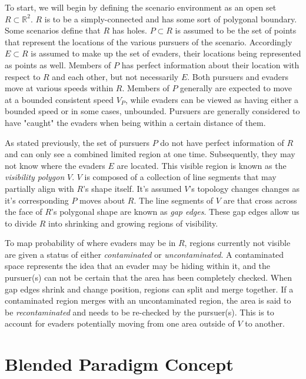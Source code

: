 \documentclass{article}
\begin{document}
To start, we will begin by defining the scenario environment as an open set \(R\subset\mathbb{R}^2\). \(R\) is to be a simply-connected and has some sort of polygonal boundary. Some scenarios define that \(R\) has holes. \(P\subset R\) is assumed to be the set of points that represent the locations of the various pursuers of the scenario. Accordingly \(E\subset R\) is assumed to make up the set of evaders, their locations being represented as points as well. Members of \(P\) has perfect information about their location with respect to \(R\) and each other, but not necessarily \(E\). Both pursuers and evaders move at various speeds within \(R\). Members of \(P\) generally are expected to move at a bounded consistent speed \(V_P\), while evaders can be viewed as having either a bounded speed or in some cases, unbounded. \cite{limVis, robotics} Pursuers are generally considered to have "caught" the evaders when being within a certain distance of them.

As stated previously, the set of pursuers \(P\) do not have perfect information of \(R\) and can only see a combined limited region at one time. Subsequently, they may not know where the evaders \(E\) are located. This visible region is known as the \emph{visibility polygon} \(V\). \(V\) is composed of a collection of line segments that may partially align with \(R\)'s shape itself. It's assumed \(V\)'s topology changes changes as it's corresponding \(P\) moves about \(R\). The line segments of \(V\) are that cross across the face of \(R\)'s polygonal shape are known as \emph{gap edges}. These gap edges allow us to divide \(R\) into shrinking and growing regions of visibility. \cite{limVis, robotics}

To map probability of where evaders may be in \(R\), regions currently not visible are given a status of either \emph{contaminated} or \emph{uncontaminated}. A contaminated space represents the idea that an evader may be hiding within it, and the pursuer(s) can not be certain that the area has been completely checked. When gap edges shrink and change position, regions can split and merge together. If a contaminated region merges with an uncontaminated region, the area is said to be \emph{recontaminated} and needs to be re-checked by the pursuer(s). This is to account for evaders potentially moving from one area outside of \(V\) to another.

\section{Blended Paradigm Concept}
\end{document}

